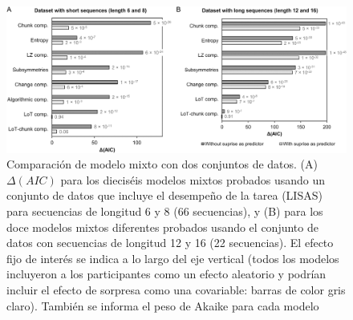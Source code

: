 \begin{figure}[t!]
   \includegraphics[scale=0.8]{figuras/plosbio/journal.pcbi.1008598.g010.PNG}
   
   \centering
   
   \caption{Comparación de modelo mixto con dos conjuntos de datos. (A) $\Delta(AIC)$ para los dieciséis modelos mixtos probados usando un conjunto de datos que incluye el desempeño de la tarea (LISAS) para secuencias de longitud 6 y 8 (66 secuencias), y (B) para los doce modelos mixtos diferentes probados usando el conjunto de datos con secuencias de longitud 12 y 16 (22 secuencias). El efecto fijo de interés se indica a lo largo del eje vertical (todos los modelos incluyeron a los participantes como un efecto aleatorio y podrían incluir el efecto de sorpresa como una covariable: barras de color gris claro). También se informa el peso de Akaike para cada modelo}
   \label{PlosBIO-F10}
\end{figure}

